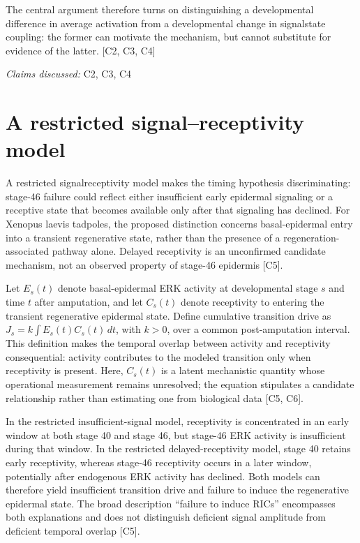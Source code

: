 \documentclass[11pt]{article}
\begin{document}
The central argument therefore turns on distinguishing a developmental difference in average activation from a developmental change in signal\textendash{}state coupling: the former can motivate the mechanism, but cannot substitute for evidence of the latter. [C2, C3, C4]

\textit{Claims discussed: }C2, C3, C4
\section{A restricted signal–receptivity model}
A restricted signal\textendash{}receptivity model makes the timing hypothesis discriminating: stage-46 failure could reflect either insufficient early epidermal signaling or a receptive state that becomes available only after that signaling has declined. For Xenopus laevis tadpoles, the proposed distinction concerns basal-epidermal entry into a transient regenerative state, rather than the presence of a regeneration-associated pathway alone. Delayed receptivity is an unconfirmed candidate mechanism, not an observed property of stage-46 epidermis [C5].

Let $E_s(t)$ denote basal-epidermal ERK activity at developmental stage $s$ and time $t$ after amputation, and let $C_s(t)$ denote receptivity to entering the transient regenerative epidermal state. Define cumulative transition drive as $J_s=k\int E_s(t)C_s(t)\,dt$, with $k>0$, over a common post-amputation interval. This definition makes the temporal overlap between activity and receptivity consequential: activity contributes to the modeled transition only when receptivity is present. Here, $C_s(t)$ is a latent mechanistic quantity whose operational measurement remains unresolved; the equation stipulates a candidate relationship rather than estimating one from biological data [C5, C6].

In the restricted insufficient-signal model, receptivity is concentrated in an early window at both stage 40 and stage 46, but stage-46 ERK activity is insufficient during that window. In the restricted delayed-receptivity model, stage 40 retains early receptivity, whereas stage-46 receptivity occurs in a later window, potentially after endogenous ERK activity has declined. Both models can therefore yield insufficient transition drive and failure to induce the regenerative epidermal state. The broad description \textquotedblleft{}failure to induce RICs\textquotedblright{} encompasses both explanations and does not distinguish deficient signal amplitude from deficient temporal overlap [C5].
\end{document}
